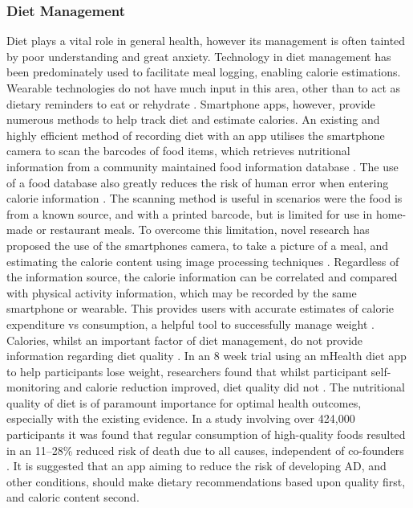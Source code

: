 \subsubsection{Diet Management}
Diet plays a vital role in general health, however its management is often tainted by poor understanding and great anxiety. Technology in diet management has been predominately used to facilitate meal logging, enabling calorie estimations. Wearable technologies do not have much input in this area, other than to act as dietary reminders to eat or rehydrate \cite{Fortmann2014}. Smartphone apps, however, provide numerous methods to help track diet and estimate calories. An existing and highly efficient method of recording diet with an app utilises the smartphone camera to scan the barcodes of food items, which retrieves nutritional information from a community maintained food information database \cite{Breton2011}. The use of a food database also greatly reduces the risk of human error when entering calorie information \cite{Turner-McGrievy2013}. The scanning method is useful in scenarios were the food is from a known source, and with a printed barcode, but is limited for use in home-made or restaurant meals. To overcome this limitation, novel research has proposed the use of the smartphones camera, to take a picture of a meal, and estimating the calorie content using image processing techniques \cite{Villalobos2012, Pouladzadeh2014}. Regardless of the information source, the calorie information can be correlated and compared with physical activity information, which may be recorded by the same smartphone or wearable. This provides users with accurate estimates of calorie expenditure vs consumption, a helpful tool to successfully manage weight \cite{DeLany2014}.
Calories, whilst an important factor of diet management, do not provide information regarding diet quality \cite{Wirt2009}. In an 8 week trial using an mHealth diet app to help participants lose weight, researchers found that whilst participant self-monitoring and calorie reduction improved, diet quality did not \cite{Wharton2015}. The nutritional quality of diet is of paramount importance for optimal health outcomes, especially with the existing evidence. In a study involving over 424,000 participants it was found that regular consumption of high-quality foods resulted in an 11–28\% reduced risk of death due to all causes, independent of co-founders \cite{Liese2015}. It is suggested that an app aiming to reduce the risk of developing AD, and other conditions, should make dietary recommendations based upon quality first, and caloric content second.

